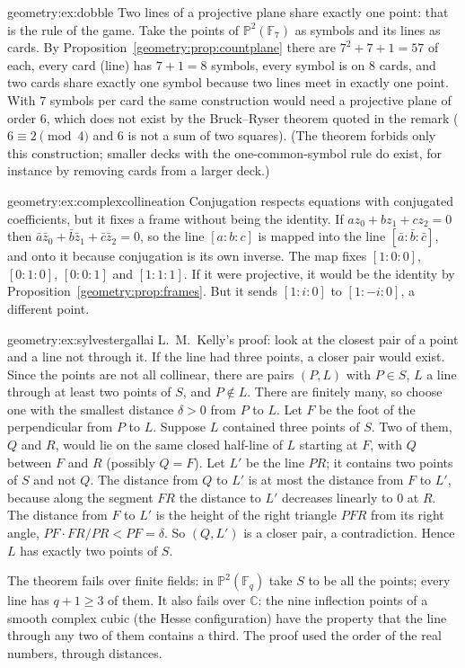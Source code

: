\begin{solution}{geometry:ex:dobble}
\idea Two lines of a projective plane share exactly one point: that is the rule of the game.
\writeup Take the points of $\mathbb P^2(\mathbb F_7)$ as symbols and its lines as cards. By Proposition~\ref{geometry:prop:countplane} there are $7^2+7+1=57$
of each, every card (line) has $7+1=8$ symbols, every symbol is on $8$ cards, and two cards share exactly one symbol because two lines meet
in exactly one point. With $7$ symbols per card the same construction would need a projective plane of order $6$, which does not exist by the
Bruck--Ryser theorem quoted in the remark ($6\equiv2\pmod4$ and $6$ is not a sum of two squares). (The theorem forbids only this construction;
smaller decks with the one-common-symbol rule do exist, for instance by removing cards from a larger deck.)
\end{solution}

\begin{solution}{geometry:ex:complexcollineation}
\idea Conjugation respects equations with conjugated coefficients, but it fixes a frame without being the identity.
\writeup If $az_0+bz_1+cz_2=0$ then $\bar a\bar z_0+\bar b\bar z_1+\bar c\bar z_2=0$, so the line $[a:b:c]$ is mapped into the line $[\bar a:\bar b:\bar c]$,
and onto it because conjugation is its own inverse. The map fixes $[1:0:0]$, $[0:1:0]$, $[0:0:1]$ and $[1:1:1]$. If it were projective, it would be
the identity by Proposition~\ref{geometry:prop:frames}. But it sends $[1:i:0]$ to $[1:-i:0]$, a different point.
\end{solution}

\begin{solution}{geometry:ex:sylvestergallai}
\idea L.~M.~Kelly's proof: look at the closest pair of a point and a line not through it. If the line had three points, a closer pair would exist.
\writeup Since the points are not all collinear, there are pairs $(P,L)$ with $P\in S$, $L$ a line through at least two points of $S$, and
$P\notin L$. There are finitely many, so choose one with the smallest distance $\delta>0$ from $P$ to $L$. Let $F$ be the foot of the perpendicular
from $P$ to $L$. Suppose $L$ contained three points of $S$. Two of them, $Q$ and $R$, would lie on the same closed half-line of $L$ starting at
$F$, with $Q$ between $F$ and $R$ (possibly $Q=F$). Let $L'$ be the line $PR$; it contains two points of $S$ and not $Q$. The distance from $Q$ to
$L'$ is at most the distance from $F$ to $L'$, because along the segment $FR$ the distance to $L'$ decreases linearly to $0$ at $R$. The distance from
$F$ to $L'$ is the height of the right triangle $PFR$ from its right angle, $PF\cdot FR/PR<PF=\delta$. So $(Q,L')$ is a closer pair, a contradiction.
Hence $L$ has exactly two points of $S$.

The theorem fails over finite fields: in $\mathbb P^2(\mathbb F_q)$ take $S$ to be all the points; every line has $q+1\ge3$ of them. It also fails over
$\mathbb C$: the nine inflection points of a smooth complex cubic (the Hesse configuration) have the property that the line through any two of them contains a
third. The proof used the order of the real numbers, through distances.
\end{solution}

